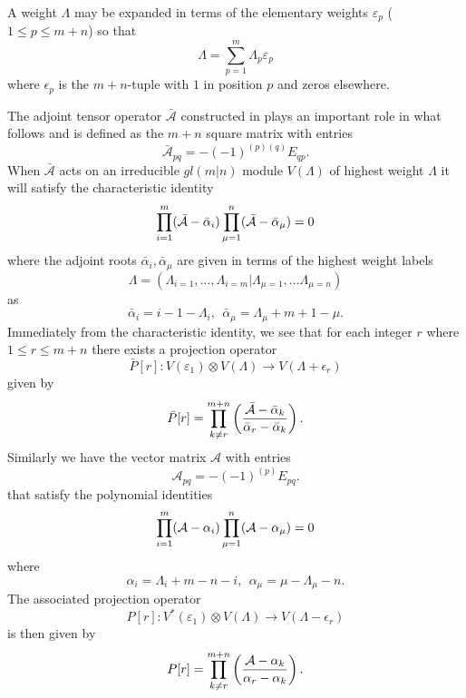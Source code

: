 \documentclass[12pt]{article}
\def\nn{\nonumber}
\begin{document}
A weight $\Lambda$ may be expanded in terms
of the elementary weights $\varepsilon_p$ ($1\leq p\leq m+n$) so that
\begin{equation*}
\Lambda = \sum_{p=1}^m\Lambda_p\varepsilon_p 
\end{equation*}
where $\epsilon_p$ is the $m+n$-tuple with $1$ in position $p$ and zeros elsewhere.

The adjoint tensor operator $\bar{\mathcal{A}}$ constructed in \cite{GIW1} plays an important role in what follows and is defined as the $m+n$ square matrix with entries
$$
\bar{\mathcal{A}}_{pq} = -(-1)^{(p)(q)} E_{qp}.
$$
When $\bar{\mathcal{A}}$ acts on an irreducible $gl(m|n)$ module $V(\Lambda)$ of highest weight $\Lambda$ it will satisfy the characteristic identity
\begin{align}
\prod_{i=1}^m ({\cal \bar{A}} - \bar{\alpha}_i) \prod^n_{\mu = 1} ({\cal \bar{A}} - \bar{\alpha}_\mu) = 0
\label{CharIdent1}
\end{align}
where the adjoint roots $\bar{\alpha}_i, \bar{\alpha}_\mu$ are given in terms of the highest weight labels
$$
\Lambda = (\Lambda_{i=1},...,\Lambda_{i=m}|\Lambda_{\mu=1},...\Lambda_{\mu=n})
$$
as
$$
{\bar{\alpha}}_i= i - 1 -\Lambda_i ,~~ {\bar{\alpha}}_\mu = \Lambda_\mu + m + 1 - \mu. 
$$
Immediately from the characteristic identity, we see that for each integer $r$ where $1 \leq  r \leq m+n$ there exists a projection operator 
$$
\bar{P}[r]: V(\varepsilon_1) \otimes V(\Lambda) \longrightarrow V(\Lambda + \epsilon_r)
$$
given by
\begin{align*}
\bar{P}[r] = \prod^{m+n}_{k \neq r} \left( \frac{{\cal \bar{A}} - \bar{\alpha}_k}{\bar{\alpha}_r
- \bar{\alpha}_k} \right)\nn.
\end{align*}
Similarly we have the vector matrix $\mathcal{A}$ with entries
$$
\mathcal{A}_{pq} = -(-1)^{(p)} E_{pq}.
$$
that satisfy the polynomial identities
\begin{align}
\prod_{i=1}^m ({\cal A} - \alpha_i) \prod^n_{\mu = 1} ({\cal A} - \alpha_\mu) = 0
\label{CharIdent2}
\end{align}
where
$$
{\alpha}_i= \Lambda_i + m - n - i ,~~ {\alpha}_\mu = \mu - \Lambda_\mu -n. 
$$
The associated projection operator 
$$
P[r]: V^*(\varepsilon_1) \otimes V(\Lambda) \longrightarrow V(\Lambda - \epsilon_r)
$$
is then given by
\begin{align*}
P[r] = \prod^{m+n}_{k \neq r} \left( \frac{{\cal A} - \alpha_k}{\alpha_r
- \alpha_k} \right)\nn.
\end{align*}
\end{document}
